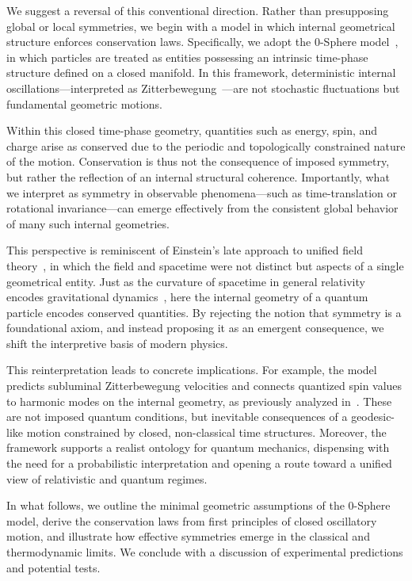 \documentclass[%
 reprint,
 amsmath,amssymb,
 aps,
]{revtex4-1}
\numberwithin{equation}{section}%
\begin{document}
We suggest a reversal of this conventional direction. Rather than presupposing global or local symmetries, we begin with a model in which internal geometrical structure enforces conservation laws. Specifically, we adopt the 0-Sphere model~\cite{hanamura2309.0047}, in which particles are treated as entities possessing an intrinsic time-phase structure defined on a closed manifold. In this framework, deterministic internal oscillations—interpreted as Zitterbewegung~\cite{dirac1928,schrodinger1930}—are not stochastic fluctuations but fundamental geometric motions.

Within this closed time-phase geometry, quantities such as energy, spin, and charge arise as conserved due to the periodic and topologically constrained nature of the motion. Conservation is thus not the consequence of imposed symmetry, but rather the reflection of an internal structural coherence. Importantly, what we interpret as symmetry in observable phenomena—such as time-translation or rotational invariance—can emerge effectively from the consistent global behavior of many such internal geometries.

This perspective is reminiscent of Einstein's late approach to unified field theory~\cite{einstein1955}, in which the field and spacetime were not distinct but aspects of a single geometrical entity. Just as the curvature of spacetime in general relativity encodes gravitational dynamics~\cite{misner1973}, here the internal geometry of a quantum particle encodes conserved quantities. By rejecting the notion that symmetry is a foundational axiom, and instead proposing it as an emergent consequence, we shift the interpretive basis of modern physics.

This reinterpretation leads to concrete implications. For example, the model predicts subluminal Zitterbewegung velocities and connects quantized spin values to harmonic modes on the internal geometry, as previously analyzed in~\cite{hanamura2507.0128}. These are not imposed quantum conditions, but inevitable consequences of a geodesic-like motion constrained by closed, non-classical time structures. Moreover, the framework supports a realist ontology for quantum mechanics, dispensing with the need for a probabilistic interpretation and opening a route toward a unified view of relativistic and quantum regimes.

In what follows, we outline the minimal geometric assumptions of the 0-Sphere model, derive the conservation laws from first principles of closed oscillatory motion, and illustrate how effective symmetries emerge in the classical and thermodynamic limits. We conclude with a discussion of experimental predictions and potential tests.
\end{document}
